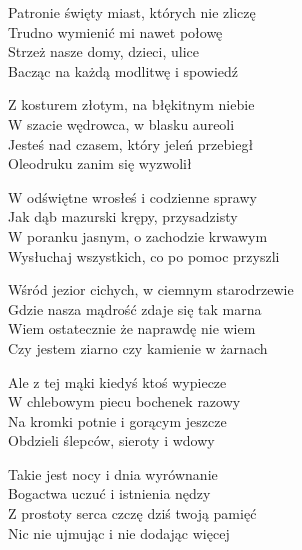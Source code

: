 \begin{text}
    Patronie święty miast, których nie zliczę\\
    Trudno wymienić mi nawet połowę\\
    Strzeż nasze domy, dzieci, ulice\\
    Bacząc na każdą modlitwę i spowiedź

    Z kosturem złotym, na błękitnym niebie\\
    W szacie wędrowca, w blasku aureoli\\
    Jesteś nad czasem, który jeleń przebiegł\\
    Oleodruku zanim się wyzwolił

    W odświętne wrosłeś i codzienne sprawy\\
    Jak dąb mazurski krępy, przysadzisty\\
    W poranku jasnym, o zachodzie krwawym\\
    Wysłuchaj wszystkich, co po pomoc przyszli

    Wśród jezior cichych, w ciemnym starodrzewie\\
    Gdzie nasza mądrość zdaje się tak marna\\
    Wiem ostatecznie że naprawdę nie wiem\\
    Czy jestem ziarno czy kamienie w żarnach

    Ale z tej mąki kiedyś ktoś wypiecze\\
    W chlebowym piecu bochenek razowy\\
    Na kromki potnie i gorącym jeszcze\\
    Obdzieli ślepców, sieroty i wdowy

    Takie jest nocy i dnia wyrównanie\\
    Bogactwa uczuć i istnienia nędzy\\
    Z prostoty serca czczę dziś twoją pamięć\\
    Nic nie ujmując i nie dodając więcej
\end{text}
\begin{chord}

\end{chord}